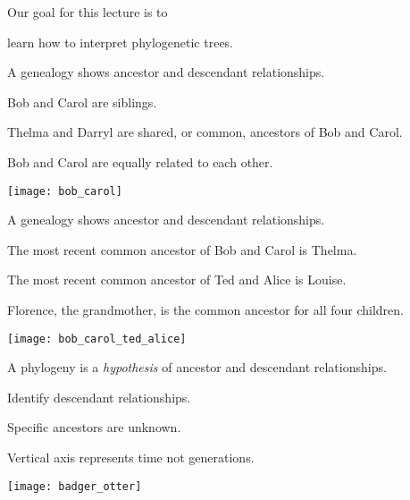 \documentclass[t]{beamer}
\begin{document}
\begin{frame}{Our goal for this lecture is to}
	
	\hangpara learn how to interpret phylogenetic trees.

\end{frame}

%

%
\begin{frame}{A genealogy shows ancestor and descendant relationships.}

\begin{multicols}{2}

	\hangpara Bob and Carol are siblings.

	\hangpara Thelma and Darryl are shared, or common, ancestors of Bob and Carol.
	
	\hangpara Bob and Carol are equally related to each other.

\columnbreak

	\texttt{[image: bob\_carol]}

\end{multicols}

\end{frame}
%
\begin{frame}{A genealogy shows ancestor and descendant relationships.}

\begin{multicols}{2}

	\hangpara The most recent common ancestor of Bob and Carol is Thelma.

	\hangpara The most recent common ancestor of Ted and Alice is Louise.
	
	\hangpara Florence, the grandmother, is the common ancestor for all four children.

\columnbreak

	\texttt{[image: bob\_carol\_ted\_alice]}

\end{multicols}

\end{frame}
%
\begin{frame}{A phylogeny is a \emph{hypothesis} of ancestor and descendant relationships.}

\begin{multicols}{2}

	\hangpara Identify descendant relationships.

	\hangpara Specific ancestors are unknown.
	
	\hangpara Vertical axis represents time not generations.

\columnbreak

	\texttt{[image: badger\_otter]}

\end{multicols}

\end{frame}
\end{document}
